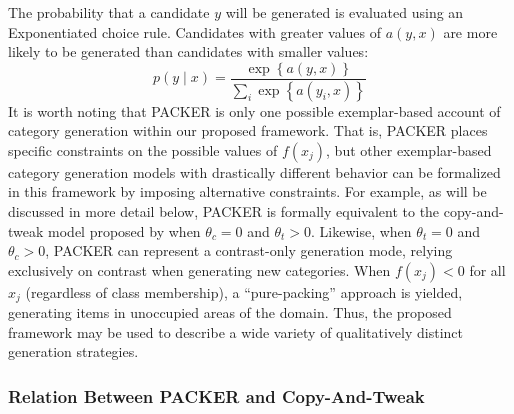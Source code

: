 \documentclass[12pt]{article}
\begin{document}
\begin{flushleft}
The probability that a candidate $y$ will be generated is evaluated using an
Exponentiated \citet{luce1977choice} choice rule. Candidates with greater values
of $a(y,x)$ are more likely to be generated than candidates with smaller values:
% 
\begin{equation} p(y \mid x) = \dfrac { \exp \left \{ a \left( y, x
\right) \right \} } { \sum_i{ \exp \left \{ a \left( y_i, x \right)
\right\} } }
\label{eq:packer-choice}
\end{equation}
% 
It is worth noting that PACKER is only one possible exemplar-based account of
category generation within our proposed framework. That is, PACKER places
specific constraints on the possible values of $f(x_j)$, but other
exemplar-based category generation models with drastically different behavior
can be formalized in this framework by imposing alternative constraints. For
example, as will be discussed in more detail below, PACKER is formally
equivalent to the copy-and-tweak model proposed by \cite{jern2013probabilistic}
when $\theta_c = 0$ and $\theta_t > 0$. Likewise, when
$\theta_t = 0$ and $\theta_c > 0$, PACKER can represent a
contrast-only generation mode, relying exclusively on contrast when generating
new categories. When $f(x_j) < 0$ for all $x_j$ (regardless of class
membership), a ``pure-packing'' approach is yielded, generating items in
unoccupied areas of the domain. Thus, the proposed framework may be used to
describe a wide variety of qualitatively distinct generation strategies.

\subsubsection{Relation Between PACKER and Copy-And-Tweak}


\end{flushleft}
\end{document}
